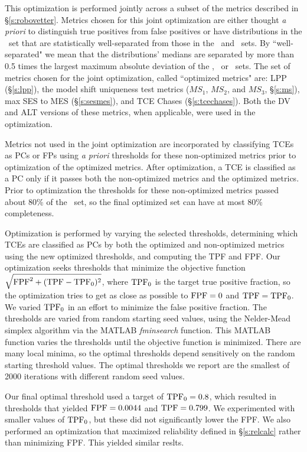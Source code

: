 This optimization is performed jointly across a subset of the metrics described in \S\ref{s:robovetter}.  Metrics chosen for this joint optimization are either thought {\it a priori} to distinguish true positives from false positives or have distributions in the \injtce\ set that are statistically well-separated from those in the \scrtce\ and \invtce\ sets.  By ``well-separated" we mean that the distributions' medians are separated by more than 0.5 times the largest maximum absolute deviation of the \injtce, \scrtce\ or \invtce\ sets.  The set of metrics chosen for the joint optimization, called ``optimized metrics" are: LPP (\S\ref{s:lpp}), the model shift uniqueness test metrics ($MS_{1}$, $MS_{2}$, and $MS_{3}$, \S\ref{s:ms}), max SES to MES (\S\ref{s:sesmes}), and TCE Chases (\S\ref{s:tcechases}). Both the DV and ALT versions of these metrics, when applicable, were used in the optimization.  

Metrics not used in the joint optimization are incorporated by classifying TCEs as PCs or FPs using {\it a priori} thresholds for these non-optimized metrics prior to optimization of the optimized metrics.  After optimization, a TCE is classified as a PC only if it passes both the non-optimized metrics and the optimized metrics.  Prior to optimization the thresholds for these non-optimized metrics passed about 80\% of the  \injtce\ set, so the final optimized set can have at most 80\% completeness.  

Optimization is performed by varying the selected thresholds, determining which TCEs are classified as PCs by both the optimized and non-optimized metrics using the new optimized thresholds, and computing the TPF and FPF.  Our optimization seeks thresholds that minimize the objective function $\sqrt{{\rm FPF}^2 + ({\rm TPF} - {\rm TPF}_0)^2}$, where ${\rm TPF}_0$ is the target true positive fraction, so the optimization tries to get as close as possible to ${\rm FPF} = 0$ and ${\rm TPF} = {\rm TPF}_0$.  We varied ${\rm TPF}_0$ in an effort to minimize the false positive fraction. The thresholds are varied from random starting seed values, using the Nelder-Mead simplex algorithm via the \textsc{MATLAB} {\it fminsearch} function.  This \textsc{MATLAB} function varies the thresholds until the objective function is minimized.  There are many local minima, so the optimal thresholds depend sensitively on the random starting threshold values.  The optimal thresholds we report are the smallest of 2000 iterations with different random seed values.

Our final optimal threshold used a target of ${\rm TPF}_0 = 0.8$, which resulted in thresholds that yielded ${\rm FPF} = 0.0044$ and ${\rm TPF} = 0.799$.  We experimented with smaller values of ${\rm TPF}_0$, but these did not significantly lower the FPF.   We also performed an optimization that maximized reliability defined in \S\ref{s:relcalc} rather than minimizing FPF. This yielded similar reslts. 

